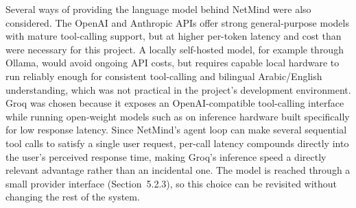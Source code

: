
Several ways of providing the language model behind NetMind were also
considered. The OpenAI and Anthropic APIs offer strong general-purpose models
with mature tool-calling support, but at higher per-token latency and cost
than were necessary for this project. A locally self-hosted model, for
example through Ollama, would avoid ongoing API costs, but requires capable
local hardware to run reliably enough for consistent tool-calling and
bilingual Arabic/English understanding, which was not practical in the
project's development environment. Groq was chosen because it exposes an
OpenAI-compatible tool-calling interface while running open-weight models
such as  on inference hardware built specifically
for low response latency. Since NetMind's agent loop can make several
sequential tool calls to satisfy a single user request, per-call latency
compounds directly into the user's perceived response time, making Groq's
inference speed a directly relevant advantage rather than an incidental one.
The model is reached through a small provider interface (Section~5.2.3), so
this choice can be revisited without changing the rest of the system.
